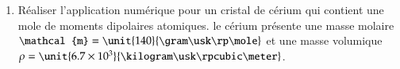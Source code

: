 \begin{exocor}
\begin{enumerate}
	  \item Réaliser l'application numérique pour un cristal de cérium qui contient
	    une mole de moments dipolaires atomiques. le cérium présente une masse molaire
	    $\mathcal{m} = \unit{140}{\gram \usk \rp \mole}$ et une masse volumique
    $\rho = \unit{6.7 \times 10^3}{\kilogram \usk \rpcubic \meter}$.
	\end{enumerate}
\end{exocor}
\newpage

